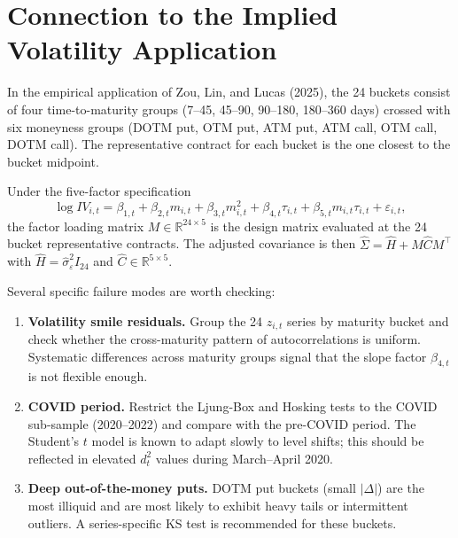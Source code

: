 \documentclass[12pt]{article}
\begin{document}
\section{Connection to the Implied Volatility Application}

In the empirical application of Zou, Lin, and Lucas (2025), the 24 buckets consist of
four time-to-maturity groups (7--45, 45--90, 90--180, 180--360 days) crossed with six
moneyness groups (DOTM put, OTM put, ATM put, ATM call, OTM call, DOTM call). The
representative contract for each bucket is the one closest to the bucket midpoint.

Under the five-factor specification
\begin{equation}
    \log IV_{i,t} = \beta_{1,t} + \beta_{2,t} m_{i,t} + \beta_{3,t} m_{i,t}^2
    + \beta_{4,t} \tau_{i,t} + \beta_{5,t} m_{i,t} \tau_{i,t} + \varepsilon_{i,t},
\end{equation}
the factor loading matrix $M \in \mathbb{R}^{24 \times 5}$ is the design matrix evaluated
at the 24 bucket representative contracts. The adjusted covariance is then
$\hat{\Sigma} = \hat{H} + M\hat{C}M^\top$ with $\hat{H} = \hat{\sigma}^2_\varepsilon I_{24}$
and $\hat{C} \in \mathbb{R}^{5 \times 5}$.

Several specific failure modes are worth checking:

\begin{enumerate}
    \item \textbf{Volatility smile residuals.} Group the 24 $z_{i,t}$ series by maturity
        bucket and check whether the cross-maturity pattern of autocorrelations is uniform.
        Systematic differences across maturity groups signal that the slope factor
        $\beta_{4,t}$ is not flexible enough.
    \item \textbf{COVID period.} Restrict the Ljung-Box and Hosking tests to the COVID
        sub-sample (2020--2022) and compare with the pre-COVID period. The Student's $t$
        model is known to adapt slowly to level shifts; this should be reflected in
        elevated $d_t^2$ values during March--April 2020.
    \item \textbf{Deep out-of-the-money puts.} DOTM put buckets (small $|\Delta|$) are
        the most illiquid and are most likely to exhibit heavy tails or
        intermittent outliers. A series-specific KS test is recommended for these buckets.
\end{enumerate}

\end{document}
